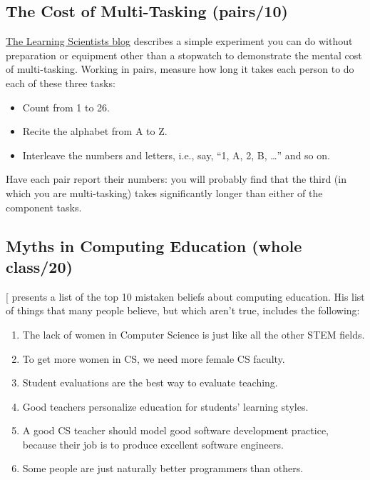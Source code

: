 \subsection{The Cost of Multi-Tasking (pairs/10)}\label{the-cost-of-multi-tasking-pairs10}

\href{http://www.learningscientists.org/blog/2017/7/28-1}{The Learning Scientists blog}
describes a simple experiment you can do without preparation or
equipment other than a stopwatch to demonstrate the mental cost of
multi-tasking. Working in pairs, measure how long it takes each person
to do each of these three tasks:

\begin{itemize}
\item
  Count from 1 to 26.
\item
  Recite the alphabet from A to Z.
\item
  Interleave the numbers and letters, i.e., say, ``1, A, 2, B,
  \ldots{}'' and so on.
\end{itemize}

Have each pair report their numbers: you will probably find that the
third (in which you are multi-tasking) takes significantly longer than
either of the component tasks.

\subsection{Myths in Computing Education (whole class/20)}\label{myths-in-computing-education-whole-class20}

{[}\protect[\hyperlink{b:Guzd2015b}{Guzd2015b}]{]} presents a list of the top 10 mistaken beliefs
about computing education. His list of things that many people
believe, but which aren't true, includes the following:

\begin{enumerate}
\item
  The lack of women in Computer Science is just like all the other
  STEM fields.
\item
  To get more women in CS, we need more female CS faculty.
\item
  Student evaluations are the best way to evaluate teaching.
\item
  Good teachers personalize education for students' learning styles.
\item
  A good CS teacher should model good software development practice,
  because their job is to produce excellent software engineers.
\item
  Some people are just naturally better programmers than others.
\end{enumerate}

